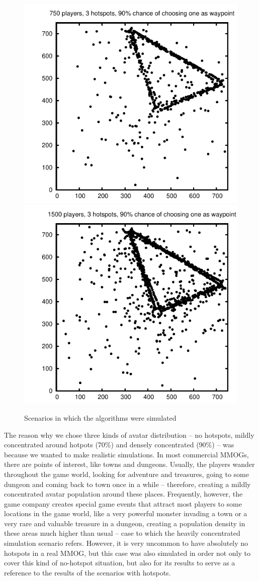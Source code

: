 \documentclass[acmjacm]{acmtrans2m}
\begin{document}
\begin{figure}
  \includegraphics[width=0.49\linewidth]{data/750players_prob90/avatarsdistribution}
  \includegraphics[width=0.49\linewidth]{data/1500players_prob90/avatarsdistribution}
  \caption{Scenarios in which the algorithms were simulated}
   \label{fig:scenarios}
\end{figure}

The reason why we chose three kinds of avatar distribution -- no hotspots, mildly concentrated around hotpots (70\%) and densely concentrated (90\%) -- was because we wanted to make realistic simulations. In most commercial MMOGs, there are points of interest, like towns and dungeons. Usually, the players wander throughout the game world, looking for adventure and treasures, going to some dungeon and coming back to town once in a while -- therefore, creating a mildly concentrated avatar population around these places. Frequently, however, the game company creates special game events that attract most players to some locations in the game world, like a very powerful monster invading a town or a very rare and valuable treasure in a dungeon, creating a population density in these areas much higher than usual -- case to which the heavily concentrated simulation scenario refers. However, it is very uncommon to have absolutely no hotspots in a real MMOG, but this case was also simulated in order not only to cover this kind of no-hotspot situation, but also for its results to serve as a reference to the results of the scenarios with hotspots.
\end{document}
